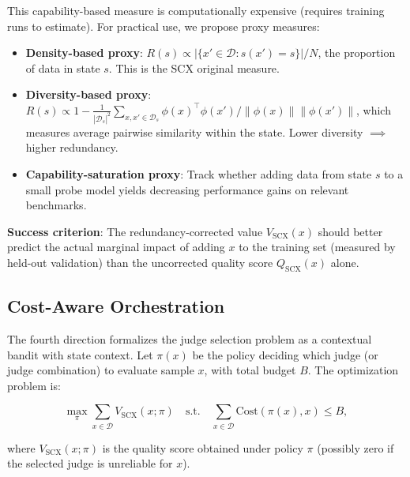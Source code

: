 \documentclass[11pt,twocolumn]{article}
\begin{document}
This capability-based measure is computationally expensive (requires training runs to estimate). For practical use, we propose proxy measures:
\begin{itemize}
    \item \textbf{Density-based proxy}: $R(s) \propto |\{x' \in \mathcal{D}: s(x') = s\}| / N$, the proportion of data in state $s$. This is the SCX original measure.
    \item \textbf{Diversity-based proxy}: $R(s) \propto 1 - \frac{1}{|\mathcal{D}_s|^2} \sum_{x,x' \in \mathcal{D}_s} \phi(x)^\top \phi(x') / \|\phi(x)\|\|\phi(x')\|$, which measures average pairwise similarity within the state. Lower diversity $\implies$ higher redundancy.
    \item \textbf{Capability-saturation proxy}: Track whether adding data from state $s$ to a small probe model yields decreasing performance gains on relevant benchmarks.
\end{itemize}

\textbf{Success criterion}: The redundancy-corrected value $V_{\text{SCX}}(x)$ should better predict the actual marginal impact of adding $x$ to the training set (measured by held-out validation) than the uncorrected quality score $Q_{\text{SCX}}(x)$ alone.

\subsection{Cost-Aware Orchestration}
\label{sec:orchestration}

The fourth direction formalizes the judge selection problem as a contextual bandit with state context. Let $\pi(x)$ be the policy deciding which judge (or judge combination) to evaluate sample $x$, with total budget $B$. The optimization problem is:

\begin{equation}
\max_{\pi} \sum_{x \in \mathcal{D}} V_{\text{SCX}}(x; \pi) \quad \text{s.t.} \quad \sum_{x \in \mathcal{D}} \text{Cost}(\pi(x), x) \leq B,
\label{eq:bandit_objective}
\end{equation}

where $V_{\text{SCX}}(x; \pi)$ is the quality score obtained under policy $\pi$ (possibly zero if the selected judge is unreliable for $x$).
\end{document}
